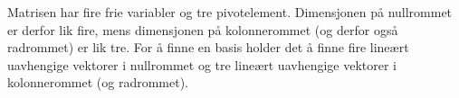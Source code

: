 \begin{oppgave}


\end{oppgave}

\begin{losning}

\begin{punkt}
Matrisen har fire frie variabler og tre pivotelement. Dimensjonen på nullrommet er derfor lik fire, mens dimensjonen på kolonnerommet (og derfor også radrommet) er lik tre. For å finne en basis holder det å finne fire lineært uavhengige vektorer i nullrommet og tre lineært uavhengige vektorer i kolonnerommet (og radrommet).



\end{punkt}
\end{losning}
